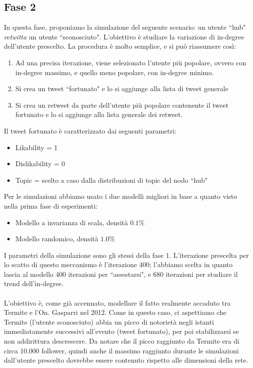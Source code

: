 \documentclass[a4paper,12pt]{article}
\begin{document}
\subsection{Fase 2}
In questa fase, proponiamo la simulazione del seguente scenario: un utente ``hub" \textit{retwitta} un utente ``sconosciuto". L'obiettivo è studiare la variazione di in-degree dell'utente prescelto. La procedura è molto semplice, e si può riassumere così:
\begin{enumerate}
\item Ad una precisa iterazione, viene selezionato l'utente più popolare, ovvero con in-degree massimo, e quello meno popolare, con in-degree minimo.
\item Si crea un tweet ``fortunato" e lo si aggiunge alla lista di tweet generale
\item Si crea un retweet da parte dell'utente più popolare contenente il tweet fortunato e lo si aggiunge alla lista generale dei retweet.  
\end{enumerate}
Il tweet fortunato è caratterizzato dai seguenti parametri:
\begin{itemize}
\item Likability = 1
\item Dislikability = 0
\item Topic = scelto a caso dalla distribuzioni di topic del nodo ``hub"
\end{itemize}
Per le simulazioni abbiamo usato i due modelli migliori in base a quanto visto nella prima fase di esperimenti:
\begin{itemize}
\item Modello a invarianza di scala, densità $0.1\%$
\item Modello randomico, densità $1.0\%$
\end{itemize}
I parametri della simulazione sono gli stessi della fase 1.
L'iterazione prescelta per lo scatto di questo meccanismo è l'iterazione 400; l'abbiamo scelta in quanto lascia al modello 400 iterazioni per ``assestarsi", e 680 iterazioni per studiare il trend dell'in-degree.
\\ \\
L'obiettivo è, come già accennato, modellare il fatto realmente accaduto tra Termite e l'On. Gasparri nel 2012. Come in questo caso, ci aspettiamo che Termite (l'utente sconosciuto) abbia un picco di notorietà negli istanti immediatamente successivi all'evento (tweet fortunato), per poi stabilizzarsi se non addirittura descrescere. Da notare che il picco raggiunto da Termite era di circa 10.000 follower, quindi anche il massimo raggiunto durante le simulazioni dall'utente prescelto dovrebbe essere contenuto rispetto alle dimensioni della rete.
\end{document}
